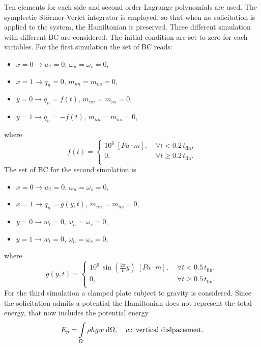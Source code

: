 \documentclass{ifacconf}
\begin{document}
Ten elements for each side and second order Lagrange polynomials are used. The symplectic St\"ormer-Verlet integrator is employed, so that when no solicitation is applied to the system, the Hamiltonian is preserved. Three different simulation with different BC are considered. The initial condition are set to zero for each variables. For the first simulation the set of BC reads:
\begin{itemize}
	\item $x=0 \rightarrow w_t = 0, \, \omega_n = \omega_s= 0$,
	\item $x=1 \rightarrow q_n = 0, \, m_{nn} = m_{ns}= 0$,
	\item $y=0 \rightarrow q_n = f(t), \, m_{nn} = m_{ns}= 0$,
	\item $y=1 \rightarrow q_n = -f(t), \, m_{nn} = m_{ns}= 0$,
\end{itemize}
where 
\begin{equation}
f(t) = \begin{cases}
10^6 \; [Pa \cdot m], \; &\forall t< 0.2 \, t_{\text{fin}}, \\
0, \; &\forall t\geq 0.2 \, t_{\text{fin}}. \\
\end{cases}
\end{equation}
The set of BC for the second simulation is
\begin{itemize}
	\item $x=0 \rightarrow w_t = 0, \, \omega_n = \omega_s= 0$,
	\item $x=1 \rightarrow q_n = g(y, t), \, m_{nn} = m_{ns}= 0$,
	\item $y=0 \rightarrow w_t = 0, \, \omega_n = \omega_s= 0$,
	\item $y=1 \rightarrow w_t = 0, \, \omega_n = \omega_s= 0$,
\end{itemize}
where 
\begin{equation}
g(y, t) = \begin{cases}
10^6 \, \sin \left( \frac{2 \pi}{L} y \right) \; [Pa \cdot m], \; &\forall t< 0.5 \, t_{\text{fin}}, \\
0, \; &\forall t\geq 0.5 \, t_{\text{fin}}. \\
\end{cases}
\end{equation}
For the third simulation a clamped plate subject to gravity is considered. Since the solicitation admits a potential the Hamiltonian does not represent the total energy, that now includes the potential energy
\begin{equation}
	E_p = \int_{\Omega} \rho h g w \d{\Omega}, \quad w \text{: vertical dislpacement}.
\end{equation}
\end{document}
